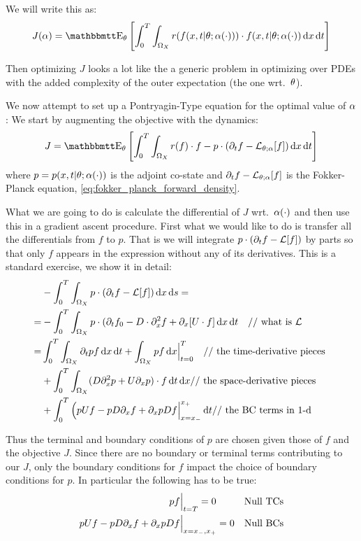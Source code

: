 \documentclass{article}
\begin{document}
We will write this as:
$$
J(\a)  = \Exp_\th \left[ \int_0^T\int_{\O_X}
r(f(x,t|\th; \a(\cdot))) \cdot   
 f(x,t|\th; \a(\cdot)) \intd{x}\intd{t} \right]
$$ 

Then optimizing $J$ looks a lot like the a generic problem in optimizing over
PDEs with the added complexity of the outer expectation (the one wrt.\ ${\theta}$).

We now attempt to set up a Pontryagin-Type equation for the optimal value of
${\alpha}$: We start by augmenting the objective with the dynamics:
\begin{equation}
J =  \Exp_\th
\left[ \int_0^T\int_{\O_X} r(f) \cdot f - p \cdot (\di_t f - \L_{\th;\a}[f])
\intd{x}\intd{t}\right] 
\label{eq:objective_augmented}
\end{equation} 
where $p =  p(x,t|{\theta}; {\alpha}(\cdot))$ is the adjoint co-state and ${\partial}_t f -
{ \mathcal{L} }_{{\theta};{\alpha}}[f]$ is the Fokker-Planck equation,
\cref{eq:fokker_planck_forward_density}.

What we are going to do is calculate the differential of $J$ wrt.\ ${\alpha}(\cdot)$
and then use this in a gradient ascent procedure. First what we would like to do
is transfer all the differentials from $f$ to $p$. That is we will integrate $p
\cdot ({\partial}_t f - { \mathcal{L} }[f])$ by parts so that only $f$ appears in the expression
without any of its derivatives. This is a standard exercise, we show it in
detail:
\begin{align*}
&-\int_0^T \int_{{\Omega}_X} p \cdot ({\partial}_t f - { \mathcal{L} }[f]) \, \mathrm{d} x \, \mathrm{d} s=
\\
=&-\int_0^T \int_{{\Omega}_X} p \cdot 
({\partial}_t f_0 - D \cdot {\partial}_x^2 f + {\partial}_x [U \cdot f]
\, \mathrm{d} x \, \mathrm{d} t \quad \textrm{// what is }{ \mathcal{L} }
\\
=&
 \int_0^T\int_{{\Omega}_X} {\partial}_t p  f \, \mathrm{d} x \, \mathrm{d} t +
  \int_{{\Omega}_X} p f\, \mathrm{d} x  \Big|^{T}_{t=0} \quad \textrm{// the time-derivative pieces }
  \\
  &+ \int_0^T \int_{{\Omega}_X}
	    (D {\partial}^2_x p + U {\partial}_x p)\cdot f 
	  \, \mathrm{d} t\, \mathrm{d} x  \textrm{// the space-derivative pieces }
	  \\
	  &+ \int_0^T 
	   \Big( p U f - p D {\partial}_xf + {\partial}_x p D f \Big|_{x={ x_{-} }}^{{ x_{+} }} 
	  \, \mathrm{d} t
	   \textrm{// the BC terms in 1-d}
\end{align*}

Thus the terminal and boundary conditions of $p$ are chosen given those of $f$
and the objective $J$. Since there are no boundary or terminal terms
contributing to our $J$, only the boundary conditions for $f$ impact the
choice of boundary conditions for $p$. In particular the following has to be
true:
\begin{align*}
pf&\Big|_{t=T}  = 0 & \textrm{Null TCs} \\
p U f - p D {\partial}_xf + {\partial}_x p D f &\Big|_{x={ x_{-} }, { x_{+} }} = 0 & \textrm{Null BCs}
\end{align*}
\end{document}
